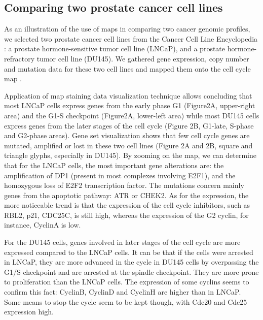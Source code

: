 \documentclass[a4,center,fleqn]{NAR}
\begin{document}
\subsection{Comparing two prostate cancer cell lines}

As an illustration of the use of maps in comparing two cancer genomic profiles, we
selected two prostate cancer cell lines from the Cancer Cell Line Encyclopedia
\cite{barretina2012cancer}: a prostate hormone-sensitive
tumor cell line (LNCaP), and a prostate hormone-refractory tumor cell line
(DU145). We gathered gene expression, copy number and mutation data for
these two cell lines and mapped them onto the cell cycle map
\cite{calzone2008comprehensive}.

Application of map staining data visualization technique allows concluding that
most LNCaP cells express genes from the early phase G1 (Figure2A, upper-right area) and the G1-S checkpoint
(Figure2A, lower-left area) while most DU145 cells express genes from the
later stages of the cell cycle (Figure 2B, G1-late, S-phase and G2-phase
areas). Gene set visualization shows that few cell cycle genes are mutated, amplified or lost
in these two cell lines (Figure 2A and 2B, square and triangle glyphs, especially in DU145).
By zooming on the map, we can determine that for the LNCaP cells, the most
important gene alterations are: the amplification of DP1 (present in most
complexes involving E2F1), and the homozygous loss of E2F2 transcription
factor. The mutations concern mainly genes from the apoptotic pathway: ATR or
CHEK2. As for the expression, the more noticeable trend is that the expression
of the cell cycle inhibitors, such as RBL2, p21, CDC25C, is still high, whereas
the expression of the G2 cyclin, for instance, CyclinA is low.

For the DU145 cells, genes involved in later stages of the cell cycle are more
expressed compared to the LNCaP cells. It can be that if the cells were
arrested in LNCaP, they are more advanced in the cycle in DU145 cells by
overpassing the G1/S checkpoint and are arrested at the spindle checkpoint.
They are more prone to proliferation than the LNCaP cells. The expression of some
cyclins seems to confirm this fact: CyclinB, CyclinD and CyclinH are higher
than in LNCaP. Some means to stop the cycle seem to be kept though, with Cdc20
and Cdc25 expression high.

\end{document}

